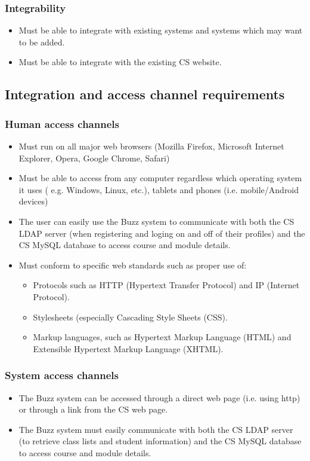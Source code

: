 \documentclass[12pt, oneside]{article}
\begin{document}
		\subsubsection{Integrability}
				\begin{itemize}
					\item Must be able to integrate with existing systems and systems which may want to be added.
					\item Must be able to integrate with the existing CS website.
				\end{itemize}
				
	\subsection{Integration and access channel requirements}
				\subsubsection{Human access channels}
				\begin{itemize}
					\item Must run on all major web browsers (Mozilla Firefox, Microsoft Internet Explorer, Opera, Google Chrome, Safari)
					\item Must be able to access from any computer regardless which operating system it uses ( e.g. Windows, Linux, etc.), tablets and phones (i.e. mobile/Android devices)
					\item The user can easily use the Buzz system to communicate with both the CS LDAP server (when registering and loging on and off of their profiles) and the CS MySQL database to access course and module details.
					\item Must conform to specific web standards such as proper use of:
					\begin{itemize}
						\item Protocols such as HTTP (Hypertext Transfer Protocol) and IP (Internet Protocol).
						\item Stylesheets (especially Cascading Style Sheets (CSS).
						\item Markup languages, such as Hypertext Markup Language (HTML) and Extensible Hypertext Markup Language (XHTML).
					\end{itemize}
				\end{itemize}
				\subsubsection{System access channels}
				\begin{itemize}
					\item The Buzz system can be accessed through a direct web page (i.e. using http) or through a link from the CS web page.
					\item The Buzz system must easily communicate with both the CS LDAP server (to retrieve class lists and student information) and the CS MySQL database to access course and module details.
				\end{itemize}
\end{document}
